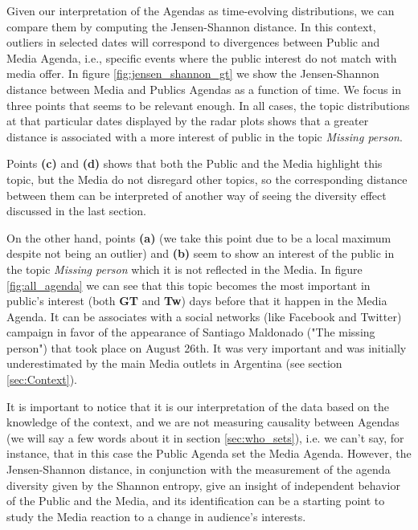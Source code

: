 \documentclass[a4paper, 12pt]{article}
\begin{document}
\par Given our interpretation of the Agendas as time-evolving distributions, we can  compare them by computing the Jensen-Shannon distance. In this context, outliers in selected dates will correspond to divergences between Public and Media Agenda, i.e., specific events where the public interest do not match with media offer.
In figure \ref{fig:jensen_shannon_gt} we show the Jensen-Shannon distance between Media and Publics Agendas as a function of time. We focus in three points that seems to be relevant enough. In all cases, the topic distributions at that particular dates displayed by  the radar plots shows that a greater distance is associated with a more interest of public in the topic \emph{Missing person}. 
\par Points \textbf{(c)} and \textbf{(d)} shows that both the Public and the Media highlight this topic, but the Media do not disregard other topics, so the corresponding distance between them can be interpreted  of another way of seeing the diversity effect discussed in the last section.

\par On the other hand,  points \textbf{(a)} (we take this point due to be a local maximum despite not being an outlier) and \textbf{(b)} seem to show an interest of the public in the topic \emph{Missing person} which it is not reflected in the Media.  In figure \ref{fig:all_agenda} we can see that this topic becomes the most important in public's interest (both \textbf{GT} and \textbf{Tw}) days before that  it happen in the Media Agenda. It can be associates  with a social networks (like Facebook and Twitter) campaign  in favor  of the appearance of Santiago Maldonado ("The missing person") that took place on  August 26th. It was very important and was initially underestimated by the main Media outlets in Argentina (see section \ref{sec:Context}). 

\par It is important to notice that it is our interpretation of the data based on the knowledge of the context, and  we are not measuring causality between Agendas (we will say a few words about it in section \ref{sec:who_sets}), i.e. we can't say, for instance, that in this case the Public Agenda set the Media Agenda. 
However, the Jensen-Shannon distance, in conjunction with the measurement of the agenda diversity given by the Shannon entropy, give an insight of independent behavior of the Public and the Media, and its identification can be a starting point to study the Media reaction to a change in audience's interests.
 
\end{document}
